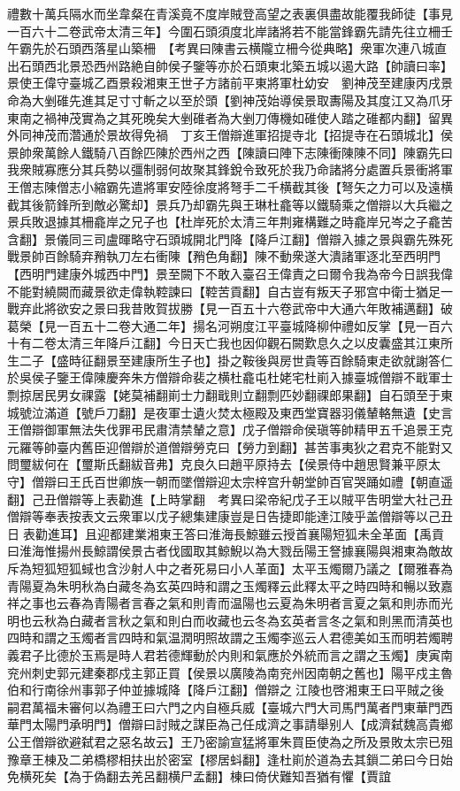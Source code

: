 禮數十萬兵隔水而坐韋粲在青溪竟不度岸賊登高望之表裏俱盡故能覆我師徒【事見一百六十二卷武帝太清三年】今圍石頭須度北岸諸將若不能當鋒霸先請先往立柵壬午霸先於石頭西落星山築柵　【考異曰陳書云横隴立柵今從典略】衆軍次連八城直出石頭西北景恐西州路絶自帥侯子鑒等亦於石頭東北築五城以遏大路【帥讀曰率】景使王偉守臺城乙酉景殺湘東王世子方諸前平東將軍杜幼安　劉神茂至建康丙戌景命為大剉碓先進其足寸寸斬之以至於頭【劉神茂始導侯景取夀陽及其度江又為爪牙東南之禍神茂實為之其死晚矣大剉碓者為大剉刀傳機如碓使人踏之碓都内翻】留異外同神茂而濳通於景故得免禍　丁亥王僧辯進軍招提寺北【招提寺在石頭城北】侯景帥衆萬餘人鐵騎八百餘匹陳於西州之西【陳讀曰陣下志陳衝陳陳不同】陳霸先曰我衆賊寡應分其兵勢以彊制弱何故聚其鋒銳令致死於我乃命諸將分處置兵景衝將軍王僧志陳僧志小縮霸先遣將軍安陸徐度將弩手二千横截其後【弩矢之力可以及遠横截其後箭鋒所到敵必驚却】景兵乃却霸先與王琳杜龕等以鐵騎乘之僧辯以大兵繼之景兵敗退據其柵龕岸之兄子也【杜岸死於太清三年荆雍構難之時龕岸兄岑之子龕苦含翻】景儀同三司盧暉略守石頭城開北門降【降戶江翻】僧辯入據之景與霸先殊死戰景帥百餘騎弃矟執刀左右衝陳【矟色角翻】陳不動衆遂大潰諸軍逐北至西明門【西明門建康外城西中門】景至闕下不敢入臺召王偉責之曰爾令我為帝今日誤我偉不能對繞闕而藏景欲走偉執鞚諫曰【鞚苦貢翻】自古豈有叛天子邪宫中衛士猶足一戰弃此將欲安之景曰我昔敗賀拔勝【見一百五十六卷武帝中大通六年敗補邁翻】破葛榮【見一百五十二卷大通二年】揚名河朔度江平臺城降柳仲禮如反掌【見一百六十有二卷太清三年降戶江翻】今日天亡我也因仰觀石闕歎息久之以皮囊盛其江東所生二子【盛時征翻景至建康所生子也】掛之鞍後與房世貴等百餘騎東走欲就謝答仁於吳侯子鑒王偉陳慶奔朱方僧辯命裴之横杜龕屯杜姥宅杜崱入據臺城僧辯不戢軍士剽掠居民男女祼露【姥莫補翻崱士力翻戢則立翻剽匹妙翻祼郎果翻】自石頭至于東城號泣滿道【號戶刀翻】是夜軍士遺火焚太極殿及東西堂寶器羽儀輦輅無遺【史言王僧辯御軍無法失伐罪弔民肅清禁輦之意】戊子僧辯命侯瑱等帥精甲五千追景王克元羅等帥臺内舊臣迎僧辯於道僧辯勞克曰【勞力到翻】甚苦事夷狄之君克不能對又問璽紱何在【璽斯氏翻紱音弗】克良久曰趙平原持去【侯景侍中趙思賢兼平原太守】僧辯曰王氏百世卿族一朝而墜僧辯迎太宗梓宫升朝堂帥百官哭踊如禮【朝直遥翻】己丑僧辯等上表勸進【上時掌翻　考異曰梁帝紀戊子王以賊平吿明堂大社己丑僧辯等奉表按表文云衆軍以戊子總集建康豈是日告捷即能達江陵乎盖僧辯等以己丑日表勸進耳】且迎都建業湘東王答曰淮海長鯨雖云授首襄陽短狐未全革面【禹貢曰淮海惟揚州長鯨謂侯景古者伐國取其鯨鯢以為大戮岳陽王詧據襄陽與湘東為敵故斥為短狐短狐蜮也含沙射人中之者死易曰小人革面】太平玉燭爾乃議之【爾雅春為青陽夏為朱明秋為白藏冬為玄英四時和謂之玉燭釋云此釋太平之時四時和暢以致嘉祥之事也云春為青陽者言春之氣和則青而温陽也云夏為朱明者言夏之氣和則赤而光明也云秋為白藏者言秋之氣和則白而收藏也云冬為玄英者言冬之氣和則黑而清英也四時和謂之玉燭者言四時和氣温潤明照故謂之玉燭李巡云人君德美如玉而明若燭聘義君子比德於玉焉是時人君若德輝動於内則和氣應於外統而言之謂之玉燭】庚寅南兖州刺史郭元建秦郡戍主郭正買【侯景以廣陵為南兖州因南朝之舊也】陽平戍主魯伯和行南徐州事郭子仲並據城降【降戶江翻】僧辯之江陵也啓湘東王曰平賊之後嗣君萬福未審何以為禮王曰六門之内自極兵威【臺城六門大司馬門萬者門東華門西華門太陽門承明門】僧辯曰討賊之謀臣為己任成濟之事請舉别人【成濟弑魏高貴鄉公王僧辯欲避弑君之惡名故云】王乃密諭宣猛將軍朱買臣使為之所及景敗太宗已殂豫章王棟及二弟橋樛相扶出於密室【樛居蚪翻】逢杜崱於道為去其鎻二弟曰今日始免横死矣【為于偽翻去羌呂翻横尸孟翻】棟曰倚伏難知吾猶有懼【賈誼
